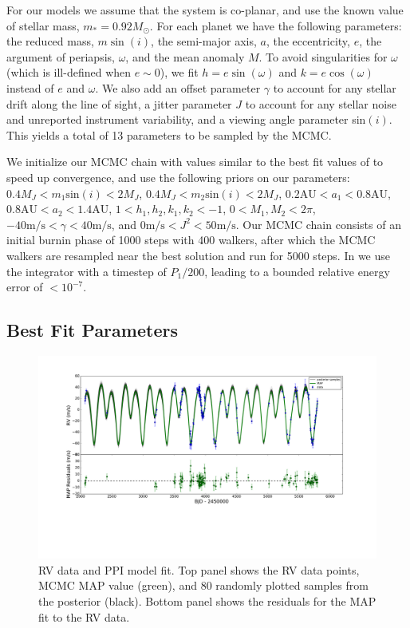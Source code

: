For our models we assume that the system is co-planar, and use the known value of stellar mass, $m_* = 0.92M_{\odot}$.
For each planet we have the following parameters: the reduced mass, $m\sin(i)$, the semi-major axis, $a$, the eccentricity, $e$, the argument of periapsis, $\omega$, and the mean anomaly $M$. 
To avoid singularities for $\omega$ (which is ill-defined when $e\sim0$), we fit $h=e\sin(\omega)$ and $k=e\cos(\omega)$ instead of $e$ and $\omega$.
We also add an offset parameter $\gamma$ to account for any stellar drift along the line of sight, a jitter parameter $J$ to account for any stellar noise and unreported instrument variability, and a viewing angle parameter sin$(i)$.
This yields a total of 13 parameters to be sampled by the MCMC. 

We initialize our MCMC chain with values similar to the best fit values of \R to speed up convergence, and use the following priors on our parameters: $0.4M_J<m_1\textrm{sin}(i) < 2M_J$, $0.4M_J<m_2\textrm{sin}(i) < 2M_J$, $0.2 \textrm{AU}<a_1< 0.8\textrm{AU}$, $0.8\textrm{AU}<a_2< 1.4\textrm{AU}$, $1<h_1, h_2, k_1, k_2<-1$, $0<M_1, M_2<2\pi$, $-40\textrm{m/s}<\gamma<40\textrm{m/s}$, and $0\textrm{m/s}<J^2<50\textrm{m/s}$.
Our MCMC chain consists of an initial burnin phase of 1000 steps with 400 walkers, after which the MCMC walkers are resampled near the best solution and run for 5000 steps.
In \reb we use the \whfast integrator \citep{Rein2015b} with a timestep of $P_1/200$, leading to a bounded relative energy error of $<10^{-7}$.


\subsection{Best Fit Parameters}
\label{sec:Results}
\begin{figure}
\includegraphics[trim=4.4cm 8cm 4.5cm 0cm, width=\textwidth]{chap6/images/hk_400walk_5000it_chkpt1_MAP_RV.pdf}
\caption{RV data and PPI model fit. 
Top panel shows the RV data points, MCMC MAP value (green), and 80 randomly plotted samples from the posterior (black). 
Bottom panel shows the residuals for the MAP fit to the RV data. 
 }
\label{fig:MCMC}
\end{figure}

